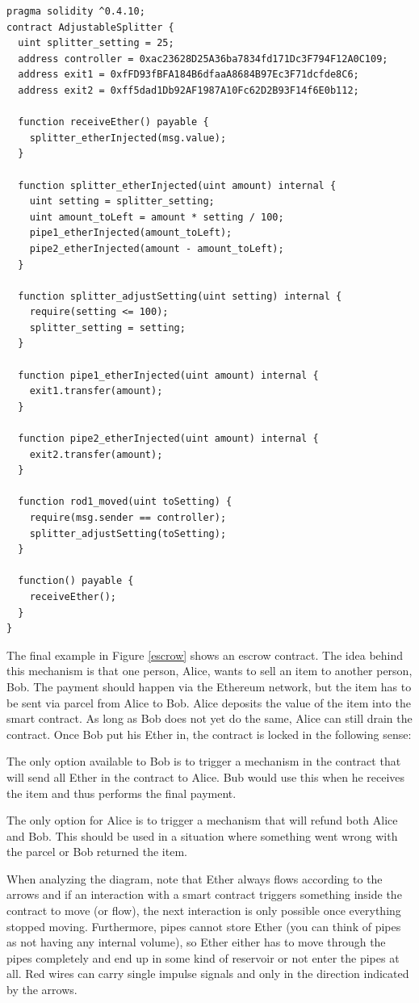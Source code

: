 \documentclass[11pt,letterpaper]{article}
\begin{document}
{
\small
\begin{verbatim}
pragma solidity ^0.4.10;
contract AdjustableSplitter {
  uint splitter_setting = 25;
  address controller = 0xac23628D25A36ba7834fd171Dc3F794F12A0C109;
  address exit1 = 0xfFD93fBFA184B6dfaaA8684B97Ec3F71dcfde8C6;
  address exit2 = 0xff5dad1Db92AF1987A10Fc62D2B93F14f6E0b112;

  function receiveEther() payable {
    splitter_etherInjected(msg.value);
  }

  function splitter_etherInjected(uint amount) internal {
    uint setting = splitter_setting;
    uint amount_toLeft = amount * setting / 100;
    pipe1_etherInjected(amount_toLeft);
    pipe2_etherInjected(amount - amount_toLeft);
  }

  function splitter_adjustSetting(uint setting) internal {
    require(setting <= 100);
    splitter_setting = setting;
  }

  function pipe1_etherInjected(uint amount) internal {
    exit1.transfer(amount);
  }

  function pipe2_etherInjected(uint amount) internal {
    exit2.transfer(amount);
  }

  function rod1_moved(uint toSetting) {
    require(msg.sender == controller);
    splitter_adjustSetting(toSetting);
  }

  function() payable {
    receiveEther();
  }
}
\end{verbatim}
}

The final example in Figure \ref{escrow} shows an escrow contract.
The idea behind this mechanism is that one person, Alice, wants to sell
an item to another person, Bob. The payment should happen via the Ethereum
network, but the item has to be sent via parcel from Alice to Bob.
Alice deposits the value of the item into the smart contract. As long
as Bob does not yet do the same, Alice can still drain the contract.
Once Bob put his Ether in, the contract is locked in the following sense:

The only option available to Bob is to trigger a mechanism in the contract
that will send all Ether in the contract to Alice. Bub would use this
when he receives the item and thus performs the final payment.

The only option for Alice is to trigger a mechanism that will refund both
Alice and Bob. This should be used in a situation where something went wrong
with the parcel or Bob returned the item.

When analyzing the diagram, note that Ether always flows according to the arrows
and if an interaction with a smart contract
triggers something inside the contract to move (or flow), the next interaction
is only possible once everything stopped moving. Furthermore, pipes cannot
store Ether (you can think of pipes as not having any internal volume),
so Ether either has to move through the pipes completely and end up in some
kind of reservoir or not enter the pipes at all. Red wires can carry single
impulse signals and only in the direction indicated by the arrows.
\end{document}
